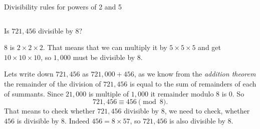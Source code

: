 \documentclass[9pt,aspectratio=169]{beamer}
\begin{document}
\begin{frame}{Divisibility rules for powers of 2 and 5}
  \begin{columns}[T]
    \begin{column}{0.5\textwidth}
      \begin{problem}
        Is $721{,}456$ divisible by $8$?
      \end{problem}
      $8$ is $2 \times 2 \times 2$. That means that we can multiply it by $5 \times 5 \times 5$ and get $10 \times 10 \times 10$, so $1,000$ must be divisible by $8$.

      Lets write down $721{,}456$ as $721{,}000 + 456$, as we know from the \emph{addition theorem} the remainder of the division of $721{,}456$ is equal to the sum of remainders of each of summants. Since $21{,}000$ is multiple of $1{,}000$ it remainder modulo $8$ is $0$. So 
      \[ 721{,}456 \equiv 456 \pmod{8}. \]
      That means to check whether $721{,}456$ divisible by $8$, we need to check, whether $456$ is divisible by $8$. Indeed $456 = 8 \times 57$, so $721{,}456$ is also divisible by $8$.\medskip
      

\end{column}
\end{columns}
\end{frame}
\end{document}

